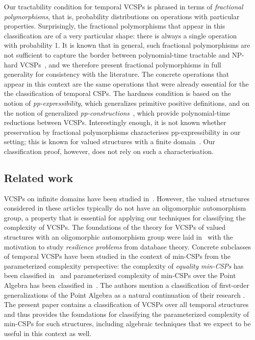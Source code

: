 \documentclass[preprint,12pt]{elsarticle}
\newcommand{\checked}[1]{#1}
\begin{document}
Our tractability condition for temporal VCSPs is phrased in terms of  \emph{fractional polymorphisms}, that is, probability distributions on operations with particular properties. Surprisingly, the fractional polymorphisms that appear in this classification are of a very particular shape: there is always a single operation with probability 1. 
It is known that in general, such fractional polymorphisms are not sufficient to capture the border between polynomial-time tractable and NP-hard VCSPs~\cite{cohen2006complexity}, and we therefore present fractional polymorphisms in full generality for consistency with the literature. 
The concrete operations that appear in this context are the same operations that were already essential for the the classification of temporal CSPs. 
The hardness condition is based on the notion of \emph{\checked{pp-}expressibility}, which generalizes primitive positive definitions, and on the notion of generalized \emph{pp-constructions}~\cite{Resilience-VCSPs}, which provide polynomial-time reductions between VCSPs. Interestingly enough, it is not known whether preservation by fractional polymorphisms characterises \checked{pp-}expressibility in our setting; this is known for valued structures with a finite domain~\cite{VCSP-Galois,FullaZivny}.
Our classification proof, however, does not rely on such a characterisation.


 
\subsection{Related work} 
VCSPs on infinite domains have been studied in~\cite{ViolaThesis, SchneiderViola, ViolaZivny}. However, the valued structures considered in these articles typically do not have an oligomorphic automorphism group, a property that is essential for applying our techniques for classifying the complexity of VCSPs. The foundations of the theory for VCSPs of valued structures with an oligomorphic automorphism group were laid in~\cite{Resilience-VCSPs} with the motivation to study \emph{resilience problems} from database theory. Concrete subclasses of temporal VCSPs have been studied in the context of min-CSPs from the parameterized complexity perspective: the complexity of \emph{equality min-CSPs} has been classified in~\cite{equalityminCSP} and parameterized complexity of min-CSPs over the Point Algebra has been classified in~\cite{PointAlgebraMinCSP}. The authors mention a classification of first-order generalizations of the Point Algebra as a natural continuation of their research \cite[Section 5]{PointAlgebraMinCSP}. The present paper contains a classification of VCSPs over all temporal structures and thus provides
the foundations for classifying the parameterized complexity of min-CSPs for such structures, including
algebraic techniques
that we expect to be useful in this context as well.
\end{document}

